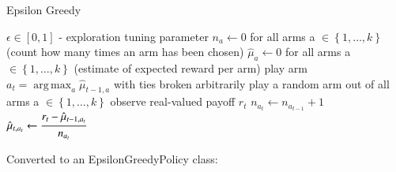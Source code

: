 \documentclass[nojss]{jss}\usepackage[]{graphicx}\usepackage[]{color}
\DeclareMathOperator*{\argmax}{arg\,max}
\begin{document}
\begin{algorithm}[H]
\caption{Epsilon Greedy}
\label{Alg:EpsilonGreedy}
\begin{algorithmic}
\REQUIRE \(    \epsilon  \in \left[ 0,1 \right] \) - exploration tuning parameter
\STATE \( n_{a} \leftarrow 0 \) for all arms a \(  \in \left\{ 1, \dots, k \right\} \)  (count how many times an arm has been chosen)
\STATE \( \hat{\mu}_{a} \leftarrow 0 \) for all arms a  \(   \in \left\{ 1, \dots, k \right\} \)  (estimate of expected reward per arm)
		\STATE play arm \(a_t = \argmax_a  \hat{\mu}_{t-1,a}  \) with ties broken arbitrarily
	\ELSE
		\STATE play a random arm out of all arms a \(  \in \left\{ 1, \dots, k \right\} \)
	\ENDIF
	\STATE observe real-valued payoff $r_t$
	\STATE \( n_{a_{t}} \leftarrow n_{a_{t-1}} + 1  \)
   \STATE \( \hat{\mu}_{t,a_{t}} \leftarrow   \cfrac{r_t - \hat{\mu}_{t-1,a_{t}} }{n_{a_{t}}}   \)
\ENDFOR
\end{algorithmic}
\end{algorithm}

Converted to an EpsilonGreedyPolicy class:
\end{document}

